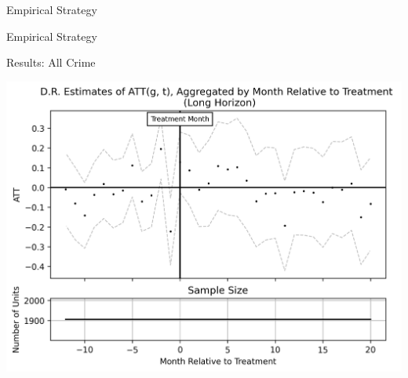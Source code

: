 \documentclass [xcolor=svgnames, t] {beamer}
\begin{document}
\begin{frame}{Empirical Strategy}
\begin{table}[H]
    \centering
    \tiny
    
    \label{tab:my_label}
\end{table}    
\end{frame}

\begin{frame}{Empirical Strategy}
\begin{table}[H]
    \centering
    \tiny
    
    \label{tab:my_label}
\end{table}    
\end{frame}



\begin{frame}{Results: All Crime}
    
    \begin{table}[H]
        \centering
        \tiny
        \includegraphics[scale=0.6]{output/all.png}
        \label{tab:my_label}
    \end{table}
\end{frame}
\end{document}
